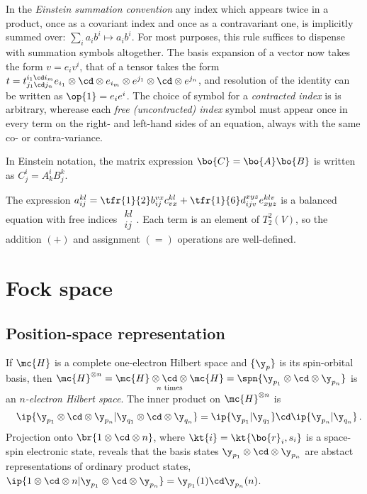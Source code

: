 \documentclass[11pt,fleqn]{article}
\numberwithin{equation}{section}
\begin{document}
\begin{ntt}
In the \textit{Einstein summation convention} any index which appears twice in a product, once as a covariant index and once as a contravariant one, is implicitly summed over: $\sum_i a_i b^i\mapsto a_ib^i$.
For most purposes, this rule suffices to dispense with summation symbols altogether.
The basis expansion of a vector now takes the form $v=e_iv^i$, that of a tensor takes the form $t = t_{j_1\cd j_n}^{i_1\cd i_m}e_{i_1}\otimes\cd\otimes e_{i_m}\otimes e^{j_1}\otimes\cd\otimes e^{j_n}$, and resolution of the identity can be written as $\op{1}=e_ie^i$.
The choice of symbol for a \textit{contracted index} is is arbitrary, wherease each \textit{free \emph{(uncontracted)} index} symbol must appear once in every term on the right- and left-hand sides of an equation, always with the same co- or contra-variance.
\end{ntt}

\begin{ex}
In Einstein notation, the matrix expression $\bo{C}=\bo{A}\bo{B}$ is written as $C^i_j=A^i_kB^k_j$.
\end{ex}

\begin{ex}
The expression
$a_{ij}^{kl}=\tfr{1}{2}b_{ij}^{vx}c_{vx}^{kl}+\tfr{1}{6}d_{ijv}^{xyz}e_{xyz}^{klv}$ is a balanced equation with free indices $\substack{kl\\ij}$.
Each term is an element of $T_2^2(V)$, so the addition $(+)$ and assignment $(=)$ operations are well-defined.
\end{ex}



\newpage
\section{Fock space}

\subsection{Position-space representation}

\begin{dfn}
If $\mc{H}$ is a complete one-electron Hilbert space and $\{\y_p\}$ is its spin-orbital basis, then $\mc{H}^{\otimes n}=\underset{\text{$n$ times}}{\mc{H}\otimes\cd\otimes\mc{H}}=\spn\{\y_{p_1}\otimes\cd\otimes\y_{p_n}\}$ is an \textit{$n$-electron Hilbert space}.
The inner product on $\mc{H}^{\otimes n}$ is
\begin{align}
&&
  \ip{\y_{p_1}\otimes\cd\otimes\y_{p_n}|\y_{q_1}\otimes\cd\otimes\y_{q_n}}
=
  \ip{\y_{p_1}|\y_{q_1}}\cd\ip{\y_{p_n}|\y_{q_n}}\,.
\end{align}
Projection onto $\br{1\otimes\cd\otimes n}$, where $\kt{i}=\kt{\bo{r}_i,s_i}$ is a space-spin electronic state, reveals that the basis states $\y_{p_1}\otimes\cd\otimes\y_{p_n}$ are abstact representations of ordinary product states, $\ip{1\otimes\cd\otimes n|\y_{p_1}\otimes\cd\otimes\y_{p_n}}=\y_{p_1}(1)\cd\y_{p_n}(n)$.
\end{dfn}
\end{document}
